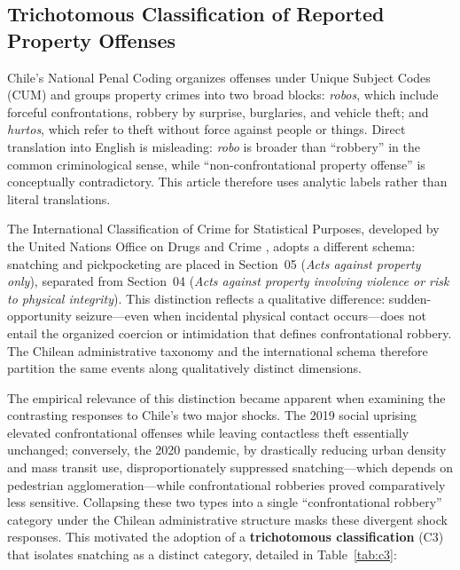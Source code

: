 \documentclass[pdflatex,sn-basic]{sn-jnl}
\begin{document}
\subsection{Trichotomous Classification of Reported Property Offenses}
\label{sub:clasificacion}

Chile's National Penal Coding organizes offenses under Unique Subject Codes (CUM) and groups property crimes into two broad blocks: \textit{robos}, which include forceful confrontations, robbery by surprise, burglaries, and vehicle theft; and \textit{hurtos}, which refer to theft without force against people or things. Direct translation into English is misleading: \textit{robo} is broader than ``robbery'' in the common criminological sense, while ``non-confrontational property offense'' is conceptually contradictory. This article therefore uses analytic labels rather than literal translations.

The International Classification of Crime for Statistical Purposes, developed by the United Nations Office on Drugs and Crime \citep{unodc2015iccs}, adopts a different schema: snatching and pickpocketing are placed in Section~05 (\textit{Acts against property only}), separated from Section~04 (\textit{Acts against property involving violence or risk to physical integrity}). This distinction reflects a qualitative difference: sudden-opportunity seizure---even when incidental physical contact occurs---does not entail the organized coercion or intimidation that defines confrontational robbery. The Chilean administrative taxonomy and the international schema therefore partition the same events along qualitatively distinct dimensions.

The empirical relevance of this distinction became apparent when examining the contrasting responses to Chile's two major shocks. The 2019 social uprising elevated confrontational offenses while leaving contactless theft essentially unchanged; conversely, the 2020 pandemic, by drastically reducing urban density and mass transit use, disproportionately suppressed snatching---which depends on pedestrian agglomeration---while confrontational robberies proved comparatively less sensitive. Collapsing these two types into a single ``confrontational robbery'' category under the Chilean administrative structure masks these divergent shock responses. This motivated the adoption of a \textbf{trichotomous classification} (C3) that isolates snatching as a distinct category, detailed in Table~\ref{tab:c3}:
\end{document}
